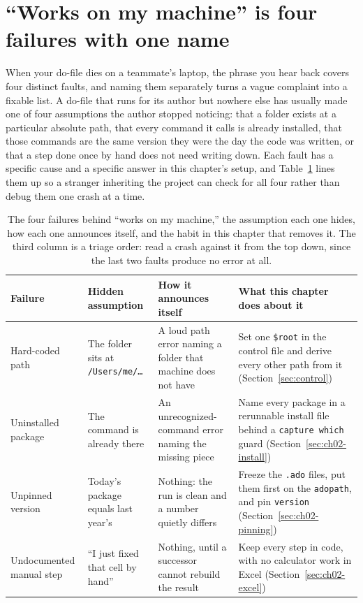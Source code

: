 \documentclass[
    a4paper,
    fontsize=10pt,
    twoside=true,
    numbers=noenddot,
]{kaobook}
\begin{document}
\section{\enquote{Works on my machine} is four failures with one name}\label{sec:ch02-worksonmine}
When your do-file dies on a teammate's laptop, the phrase you hear back covers four distinct faults, and naming them separately turns a vague complaint into a fixable list. A do-file that runs for its author but nowhere else has usually made one of four assumptions the author stopped noticing: that a folder exists at a particular absolute path, that every command it calls is already installed, that those commands are the same version they were the day the code was written, or that a step done once by hand does not need writing down. Each fault has a specific cause and a specific answer in this chapter's setup, and Table~\ref{tab:ch02-worksonmine} lines them up so a stranger inheriting the project can check for all four rather than debug them one crash at a time.

\begin{table}[htbp]
\centering
\footnotesize
\caption[The four ``works on my machine'' failures]{The four failures behind \enquote{works on my machine,} the assumption each one hides, how each one announces itself, and the habit in this chapter that removes it. The third column is a triage order: read a crash against it from the top down, since the last two faults produce no error at all.}
\label{tab:ch02-worksonmine}
\footnotesize
\begin{tabular}{@{}p{2.4cm}p{3.3cm}p{4.0cm}p{5.0cm}@{}}
\hline
Failure & Hidden assumption & How it announces itself & What this chapter does about it \\
\hline
Hard-coded path & The folder sits at \texttt{/Users/me/\dots} & A loud path error naming a folder that machine does not have & Set one \texttt{\$root} in the control file and derive every other path from it (Section~\ref{sec:control}) \\
Uninstalled package & The command is already there & An unrecognized-command error naming the missing piece & Name every package in a rerunnable install file behind a \texttt{capture which} guard (Section~\ref{sec:ch02-install}) \\
Unpinned version & Today's package equals last year's & Nothing: the run is clean and a number quietly differs & Freeze the \texttt{.ado} files, put them first on the \texttt{adopath}, and pin \texttt{version} (Section~\ref{sec:ch02-pinning}) \\
Undocumented manual step & \enquote{I just fixed that cell by hand} & Nothing, until a successor cannot rebuild the result & Keep every step in code, with no calculator work in Excel (Section~\ref{sec:ch02-excel}) \\
\hline
\end{tabular}
\end{table}
\end{document}
